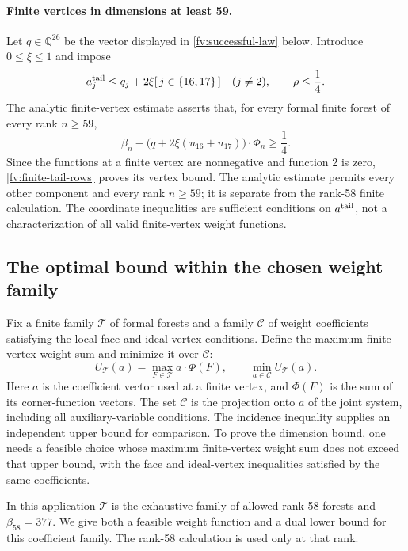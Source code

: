 \documentclass[11pt]{article}
\theoremstyle{definition}
\theoremstyle{remark}
\numberwithin{equation}{section}
\newcommand{\Q}{\mathbb Q}
\begin{document}
\paragraph{Finite vertices in dimensions at least 59.}
Let $q\in\Q^{26}$ be the vector displayed in
\eqref{fv:successful-law} below. Introduce $0\le\xi\le1$ and impose
\begin{equation}\label{fv:finite-tail-rows}
 a^{\rm tail}_j\le q_j+2\xi[\,j\in\{16,17\}\,]
       \quad(j\ne2),\qquad \rho\le\frac14.
\end{equation}
The analytic finite-vertex estimate asserts that, for every
formal finite forest of every rank $n\ge59$,
\[
 \beta_n-\bigl(q+2\xi(u_{16}+u_{17})\bigr)\cdot\Phi_n
                                                       \ge\frac14.
\]
Since the functions at a finite vertex are nonnegative and function
2 is zero, \eqref{fv:finite-tail-rows} proves its vertex bound. The
analytic estimate permits every other component and every rank
$n\ge59$; it is separate from the rank-58 finite calculation. The
coordinate inequalities are sufficient conditions on
$a^{\rm tail}$, not a characterization of all valid finite-vertex
weight functions.

\subsection{The optimal bound within the chosen weight family}
\label{fv:377}

Fix a finite family $\mathcal T$ of formal forests and a family
$\mathcal C$ of weight coefficients satisfying the local face and
ideal-vertex conditions. Define the maximum finite-vertex weight sum
and minimize it over $\mathcal C$:
\begin{equation}\label{fv:budget-template}
 U_{\mathcal T}(a)=\max_{F\in\mathcal T}a\cdot\Phi(F),
 \qquad \min_{a\in\mathcal C}U_{\mathcal T}(a).
\end{equation}
Here $a$ is the coefficient vector used at a finite vertex, and
$\Phi(F)$ is the sum of its corner-function vectors. The set
$\mathcal C$ is the projection onto $a$ of the joint system, including
all auxiliary-variable conditions. The incidence inequality supplies
an independent upper bound for comparison. To prove the dimension
bound, one needs a feasible choice whose maximum finite-vertex
weight sum does not exceed that upper bound, with the face and
ideal-vertex inequalities satisfied by the same coefficients.

In this application $\mathcal T$ is the exhaustive family of allowed
rank-58 forests and $\beta_{58}=377$. We give both a feasible weight
function and a dual lower bound for this coefficient family. The
rank-58 calculation is used only at that rank.
\end{document}
